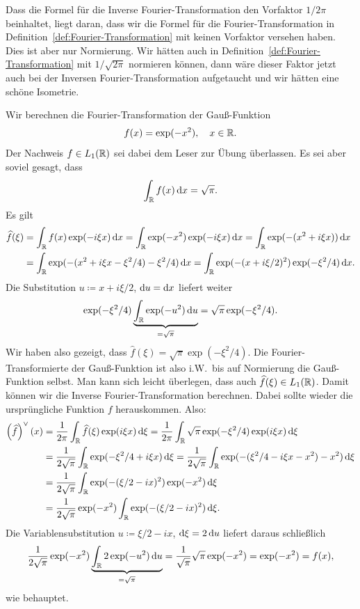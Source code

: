 \begin{remark}
\begin{description}
		Dass die Formel für die Inverse Fourier-Transformation den Vorfaktor $ 1 / 2\pi $ beinhaltet,
		liegt daran, dass wir die Formel für die Fourier-Transformation in 
		Definition~\ref{def:Fourier-Transformation} mit keinen Vorfaktor versehen haben. Dies ist aber 
		nur Normierung. Wir hätten auch in Definition~\ref{def:Fourier-Transformation} mit
		$ 1 / \sqrt{2\pi} $ normieren können, dann wäre dieser Faktor jetzt auch bei der Inversen
		Fourier-Transformation aufgetaucht und wir hätten eine schöne Isometrie.
	\end{description}
\end{remark}

\begin{example}
Wir berechnen die Fourier-Transformation der Gauß-Funktion
\[
  f(x) = \exp(-x^{2}), \quad x \in \mathbb{R}.
\]
Der Nachweis $ f \in L_{1}(\mathbb{R}) $ sei dabei dem Leser zur Übung überlassen. Es sei aber soviel 
gesagt, dass
\[
  \int_{\R} f(x) \dif x = \sqrt{\pi}.
\]
Es gilt
\begin{align*}
   \widehat{f}(\xi)
&= \int_{\R} f(x) \exp(-i\xi x) \dif x
 = \int_{\R} \exp(-x^{2}) \exp(-i\xi x) \dif x
 = \int_{\R} \exp(-(x^{2} + i\xi x)) \dif x \\
&= \int_{\R} \exp(-(x^{2} + i\xi x - \xi^{2} / 4) - \xi^{2}/4 ) \dif x
 = \int_{\R} \exp(-(x + i\xi / 2)^{2}) \exp(-\xi^{2}/4) \dif x.
\end{align*}
Die Substitution $ u \coloneqq x + i\xi / 2 $, $ \dif u = \dif x $ liefert weiter
\[
    \exp(-\xi^{2}/4) \underbrace{ \int_{\R} \exp(-u^{2}) \dif u }_{=\sqrt{\pi}}
  = \sqrt{\pi} \exp(-\xi^{2}/4).
\]
Wir haben also gezeigt, dass $ \widehat{f}(\xi) = \sqrt{\pi} \exp(-\xi^{2}/4) $. Die
Fourier-Transformierte der Gauß-Funktion ist also i.W.\ bis auf Normierung die Gauß-Funktion selbst.
Man kann sich leicht überlegen, dass auch $ \widehat{f}(\xi) \in L_{1}(\mathbb{R}) $. Damit können wir
die Inverse Fourier-Transformation berechnen. Dabei sollte wieder die ursprüngliche Funktion $ f $
herauskommen. Also:
\begin{align*}
   \left( \widehat{f} \right)^{\vee}(x)
&= \frac{1}{2\pi} \int_{\R} \widehat{f}(\xi) \exp(i\xi x) \dif \xi
 = \frac{1}{2\pi} \int_{\R} \sqrt{\pi} \exp(-\xi^{2}/4) \exp(i\xi x) \dif \xi \\
&= \frac{1}{2\sqrt{\pi}} \int_{\R} \exp(-\xi^{2}/4 + i\xi x) \dif \xi
 = \frac{1}{2\sqrt{\pi}} \int_{\R} \exp(- (\xi^{2}/4 - i\xi x - x^{2}) - x^{2}) \dif \xi \\
&= \frac{1}{2\sqrt{\pi}} \int_{\R} \exp(-(\xi/2 - ix)^{2}) \exp(-x^{2}) \dif \xi \\
&= \frac{1}{2\sqrt{\pi}} \exp(-x^{2}) \int_{\R} \exp(-(\xi/2 - ix)^{2}) \dif \xi.
\end{align*}
Die Variablensubstitution $ u \coloneqq \xi / 2 - ix $, $ \dif \xi = 2 \dif u $ liefert 
daraus schließlich
\[
    \frac{1}{2\sqrt{\pi}} \exp(-x^{2}) \underbrace{ \int_{\R} 2\exp(-u^{2}) \dif u }_{=\sqrt{\pi}}
  = \frac{1}{\sqrt{\pi}} \sqrt{\pi} \exp(-x^{2})
  = \exp(-x^{2}) = f(x),
\]
wie behauptet.
\end{example}

